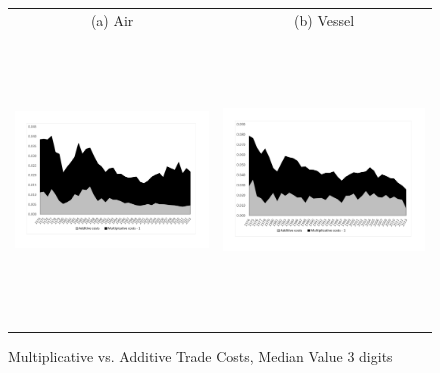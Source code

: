 \documentclass[a4paper,11pt]{article}
\begin{document}
\begin{figure}[H]
\caption{Multiplicative vs. Additive Trade Costs, Median Value 3 digits}\label{fig:mult_vs_add}
\begin{center}
\begin{tabular}{cc}
{\small (a) Air } & {\small (b) Vessel}\\
\includegraphics[width=3.5in, height=3in]{graph2a.pdf}
& \includegraphics[width=3.5in,height=3in]{graph2b.pdf} \\
\end{tabular}
\end{center}
\end{figure}
\end{document}
